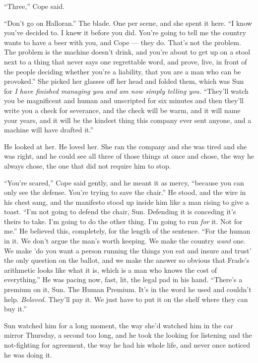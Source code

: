 \documentclass[11pt,openany]{book}
\begin{document}
``Three,'' Cope said.

``Don't go on Halloran.'' The blade. One per scene, and she spent it here. ``I know you've decided to. I knew it before you did. You're going to tell me the country wants to have a beer with you, and Cope --- they do. That's not the problem. The problem is the machine doesn't drink, and you're about to get up on a stool next to a thing that never says one regrettable word, and prove, live, in front of the people deciding whether you're a liability, that you are a man who can be provoked.'' She picked her glasses off her head and folded them, which was Sun for \textit{I have finished managing you and am now simply telling you.} ``They'll watch you be magnificent and human and unscripted for six minutes and then they'll write you a check for severance, and the check will be warm, and it will name your years, and it will be the kindest thing this company ever sent anyone, and a machine will have drafted it.''

He looked at her. He loved her. She ran the company and she was tired and she was right, and he could see all three of those things at once and chose, the way he always chose, the one that did not require him to stop.

``You're scared,'' Cope said gently, and he meant it as mercy, ``because you can only see the defense. You're trying to save the chair.'' He stood, and the wire in his chest sang, and the manifesto stood up inside him like a man rising to give a toast. ``I'm not going to defend the chair, Sun. Defending it is conceding it's theirs to take. I'm going to do the other thing. I'm going to run \textit{for} it. Not for me.'' He believed this, completely, for the length of the sentence. ``For the human in it. We don't argue the man's worth keeping. We make the country \textit{want} one. We make 'do you want a person running the things you eat and insure and trust' the only question on the ballot, and we make the answer so obvious that Frade's arithmetic looks like what it is, which is a man who knows the cost of everything.'' He was pacing now, fast, lit, the legal pad in his hand. ``There's a premium on it, Sun. The Human Premium. It's in the word he used and couldn't help. \textit{Beloved.} They'll pay it. We just have to put it on the shelf where they can buy it.''

Sun watched him for a long moment, the way she'd watched him in the car mirror Thursday, a second too long, and he took the looking for listening and the not-fighting for agreement, the way he had his whole life, and never once noticed he was doing it.
\end{document}
